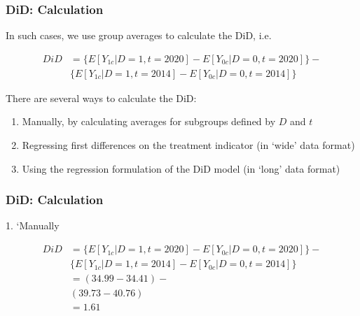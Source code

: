 \documentclass[12pt,english,dvipsnames,aspectratio=169,handout]{beamer}\usepackage[]{graphicx}\usepackage[]{xcolor}
\begin{document}
\begin{frame}
  \frametitle{DiD: Calculation}
\footnotesize

In such cases, we use group averages to calculate the DiD, i.e.\

\begin{align*}
DiD &= \{E[Y_{1c}|D=1,t=2020] - E[Y_{0c}|D=0,t=2020]\} - \\ 
    &  \{E[Y_{1c}|D=1,t=2014] - E[Y_{0c}|D=0,t=2014]\}
\end{align*}

There are several ways to calculate the DiD:
  \begin{enumerate}
    \item Manually, by calculating averages for subgroups defined by $D$ and $t$
    \item Regressing first differences on the treatment indicator (in `wide' data format)
    \item Using the regression formulation of the DiD model (in `long' data format)
  \end{enumerate}

\vspace{1cm}
\end{frame}



\begin{frame}
  \frametitle{DiD: Calculation}
\footnotesize

1. `Manually

\begin{align*}
DiD &= \{E[Y_{1c}|D=1,t=2020] - E[Y_{0c}|D=0,t=2020]\} - \\ 
    &  \{E[Y_{1c}|D=1,t=2014] - E[Y_{0c}|D=0,t=2014]\} \\
    &= (34.99-34.41) - \\
    &   (39.73-40.76) \\
    &= 1.61
\end{align*}

\vspace{1cm}
\end{frame}
\end{document}
